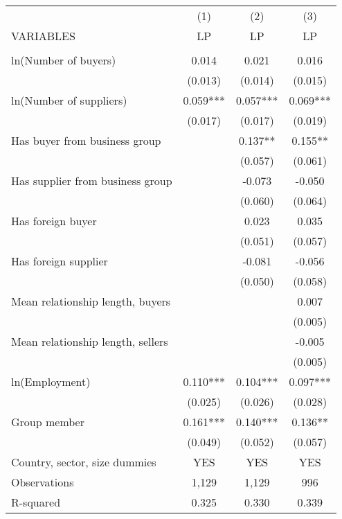 
\begin{tabular}{lccc} \hline
 & (1) & (2) & (3) \\
VARIABLES & LP & LP & LP \\ \hline
 &  &  &  \\
ln(Number of buyers) & 0.014 & 0.021 & 0.016 \\
 & (0.013) & (0.014) & (0.015) \\
ln(Number of suppliers) & 0.059*** & 0.057*** & 0.069*** \\
 & (0.017) & (0.017) & (0.019) \\
Has buyer from business group &  & 0.137** & 0.155** \\
 &  & (0.057) & (0.061) \\
Has supplier from business group &  & -0.073 & -0.050 \\
 &  & (0.060) & (0.064) \\
Has foreign buyer &  & 0.023 & 0.035 \\
 &  & (0.051) & (0.057) \\
Has foreign supplier &  & -0.081 & -0.056 \\
 &  & (0.050) & (0.058) \\
Mean relationship length, buyers &  &  & 0.007 \\
 &  &  & (0.005) \\
Mean relationship length, sellers &  &  & -0.005 \\
 &  &  & (0.005) \\
ln(Employment) & 0.110*** & 0.104*** & 0.097*** \\
 & (0.025) & (0.026) & (0.028) \\
Group member & 0.161*** & 0.140*** & 0.136** \\
 & (0.049) & (0.052) & (0.057) \\
\hline
Country, sector, size dummies &YES &YES &YES\\
Observations & 1,129 & 1,129 & 996 \\
 R-squared & 0.325 & 0.330 & 0.339 \\ \hline
\end{tabular}

